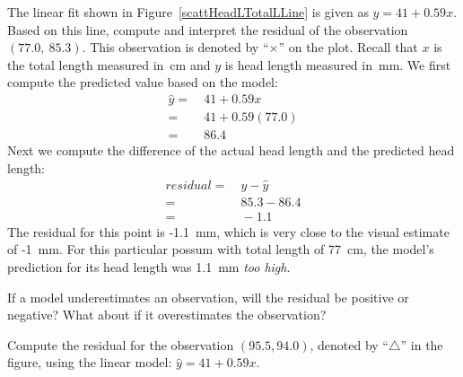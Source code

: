 \begin{examplewrap}
\begin{nexample}{The linear fit shown in Figure~\ref{scattHeadLTotalLLine} is given as $\hat{y} = 41 + 0.59x$. Based on this line, compute and interpret the residual of the observation $(77.0, \ 85.3)$. This observation is denoted by ``$\times$'' on the plot. Recall that $x$ is the total length measured in~cm and $y$ is head length measured in~mm.}
We first compute the predicted value based on the model:
\begin{align*}
\hat{y} =& \ 41+0.59x \\
=& \ 41+0.59(77.0)\\
=& \  86.4
\end{align*}
Next we compute the difference of the actual head length and the predicted head length:
\begin{align*}
residual =& \ y - \hat{y} \\
=& \ 85.3 -  86.4 \\
=& \ -1.1
\end{align*}
The residual for this point is -1.1~mm, which is very close to the visual estimate of -1~mm.  For this particular possum with total length of 77~cm, the model's prediction for its head length was 1.1~mm \emph{too high}.
\end{nexample}
\end{examplewrap}


\begin{exercisewrap}
\begin{nexercise}
If a model underestimates an observation, will the residual be positive or negative? What about if it overestimates the observation?\footnotemark 
\end{nexercise}
\end{exercisewrap}

\begin{exercisewrap}
\begin{nexercise}
Compute the residual for the observation $(95.5, 94.0)$, denoted by ``$\triangle$'' in the figure, using the linear model: $\hat{y} = 41 + 0.59x$.\footnotemark 
\end{nexercise}
\end{exercisewrap}

